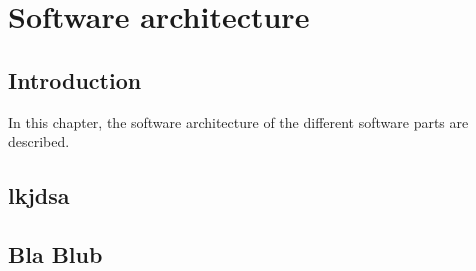 
\chapter{Software architecture} %

\label{Chapter3} %



\section{Introduction}

In this chapter, the software architecture of the different software parts are described.

\section{lkjdsa}
\section{Bla Blub}

